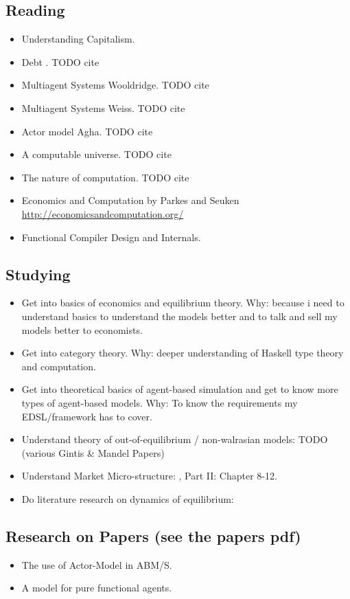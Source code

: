 \documentclass{article}
\begin{document}
\subsection{Reading}
\begin{itemize}
\item Understanding Capitalism. \cite{bowles_understanding_2005}
\item Debt . TODO cite
\item Multiagent Systems Wooldridge. TODO cite
\item Multiagent Systems Weiss. TODO cite
\item Actor model Agha. TODO cite
\item A computable universe. TODO cite
\item The nature of computation. TODO cite
\item Economics and Computation by Parkes and Seuken \url{http://economicsandcomputation.org/}
\item Functional Compiler Design and Internals.
\end{itemize}

\subsection{Studying}
\begin{itemize}
\item Get into basics of economics and equilibrium theory. Why: because i need to understand basics to understand the models better and to talk and sell my models better to economists.
\item Get into category theory. Why: deeper understanding of Haskell type theory and computation.
\item Get into theoretical basics of agent-based simulation and get to know more types of agent-based models. Why: To know the requirements my EDSL/framework has to cover.
\item Understand theory of out-of-equilibrium / non-walrasian models: TODO (various Gintis \& Mandel Papers)
\item Understand Market Micro-structure: \cite{LehalleLaruelle2013}, \cite{baker_market_2013} Part II: Chapter 8-12.
\item Do literature research on dynamics of equilibrium: \cite{emergent_2008}
\end{itemize}

\subsection{Research on Papers (see the papers pdf)}
\begin{itemize}
\item The use of Actor-Model in ABM/S.
\item A model for pure functional agents.
\end{itemize}





\end{document}
